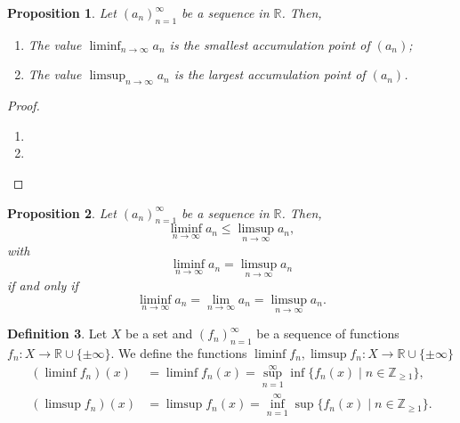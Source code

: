 \documentclass[a4paper, openany]{memoir}
\theoremstyle{definition}
\newtheorem{definition}{Definition}[section]
\theoremstyle{plain}
\newtheorem{proposition}[definition]{Proposition}
\begin{document}
    \begin{proposition}
        Let $(a_n)_{n=1}^\infty$ be a sequence in $\mathbb{R}$. Then,
        \begin{enumerate}
            \item The value $\liminf_{n \to \infty} a_n$ is the smallest accumulation point of $(a_n)$;
            \item The value $\limsup_{n \to \infty} a_n$ is the largest accumulation point of $(a_n)$.
        \end{enumerate}
    \end{proposition}
    \begin{proof}
        \hspace*{0pt}
        \begin{enumerate}
            \item 
            
            \item 
        \end{enumerate}
    \end{proof}
    
    \begin{proposition}
        Let $(a_n)_{n=1}^\infty$ be a sequence in $\mathbb{R}$. Then,
        \[\liminf_{n \to \infty} a_n \leq \limsup_{n \to \infty} a_n,\]
        with
        \[\liminf_{n \to \infty} a_n = \limsup_{n \to \infty} a_n\]
        if and only if
        \[\liminf_{n \to \infty} a_n = \lim_{n \to \infty} a_n = \limsup_{n \to \infty} a_n.\]
    \end{proposition}
    
    \begin{definition}
        Let $X$ be a set and $(f_n)_{n=1}^\infty$ be a sequence of functions $f_n \colon X \to \mathbb{R} \cup \{\pm \infty\}$. We define the functions $\liminf f_n, \limsup f_n \colon X \to \mathbb{R} \cup \{\pm \infty\}$
        \begin{align*}
            (\liminf f_n)(x) &= \liminf f_n(x) = \sup_{n=1}^\infty \inf \{f_n(x) \mid n \in \mathbb{Z}_{\geq 1}\}, \\
            (\limsup f_n)(x) &= \limsup f_n(x) = \inf_{n=1}^\infty \sup \{f_n(x) \mid n \in \mathbb{Z}_{\geq 1}\}.
        \end{align*}
    \end{definition}
\end{document}
